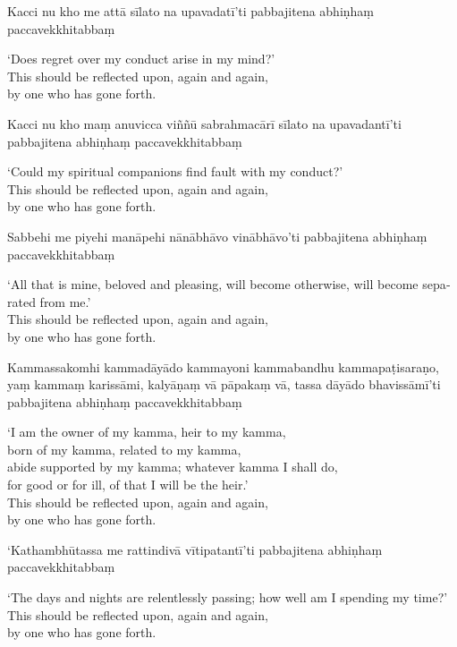 Kacci nu kho me attā sīlato na upavadatī'ti pabbajitena abhiṇhaṃ paccavekkhitabbaṃ

\begin{english}
  `Does regret over my conduct arise in my mind?'\\
  This should be reflected upon, again and again,\\
  by one who has gone forth.
\end{english}

Kacci nu kho maṃ anuvicca viññū sabrahmacārī sīlato na upavadantī'ti pabbajitena abhiṇhaṃ paccavekkhitabbaṃ

\begin{english}
  `Could my spiritual companions find fault with my conduct?'\\
  This should be reflected upon, again and again,\\
  by one who has gone forth.
\end{english}

Sabbehi me piyehi manāpehi nānābhāvo vinābhāvo'ti pabbajitena abhiṇhaṃ paccavekkhitabbaṃ

\begin{english}
  `All that is mine, beloved and pleasing, will become otherwise, will become separated from me.'\\
  This should be reflected upon, again and again,\\
  by one who has gone forth.
\end{english}

Kammassakomhi kammadāyādo kammayoni kammabandhu kammapaṭisaraṇo, yaṃ kammaṃ karissāmi, kalyāṇaṃ vā pāpakaṃ vā, tassa dāyādo bhavissāmī'ti pabbajitena abhiṇhaṃ paccavekkhitabbaṃ

\begin{english}
  `I am the owner of my kamma, heir to my kamma,\\
  born of my kamma, related to my kamma,\\
  abide supported by my kamma; whatever kamma I shall do,\\
  for good or for ill, of that I will be the heir.'\\
  This should be reflected upon, again and again,\\
  by one who has gone forth.
\end{english}

`Kathambhūtassa me rattindivā vītipatantī'ti pabbajitena abhiṇhaṃ paccavekkhitabbaṃ

\begin{english}
  `The days and nights are relentlessly passing; how well am I spending my time?'\\
  This should be reflected upon, again and again,\\
  by one who has gone forth.
\end{english}

